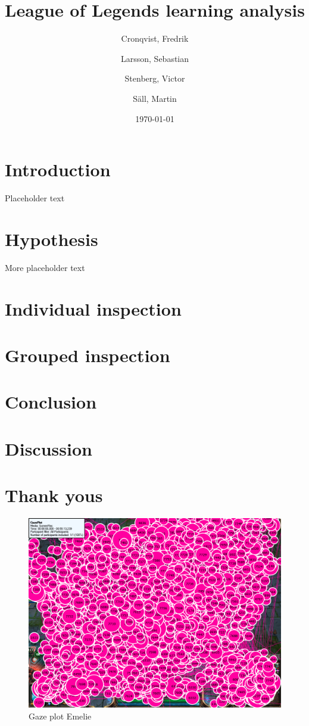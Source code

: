 \documentclass{article}
\author{Cronqvist, Fredrik \and Larsson, Sebastian \and Stenberg, Victor \and S\"{a}ll, Martin}
\date{\today}
\title{League of Legends learning analysis}
\begin{document}
\maketitle

\section{Introduction}
Placeholder text

\section{Hypothesis}
More placeholder text

\section{Individual inspection}

\section{Grouped inspection}

\section{Conclusion}

\section{Discussion}

\section{Thank yous}

\begin{figure}[h!]
\begin{center}
\includegraphics*[width=0.90\columnwidth]{images/gazeplot/Emelie}
\end{center}
\caption{Gaze plot Emelie}
\label{gaze_eme}
\end{figure}
\end{document}
